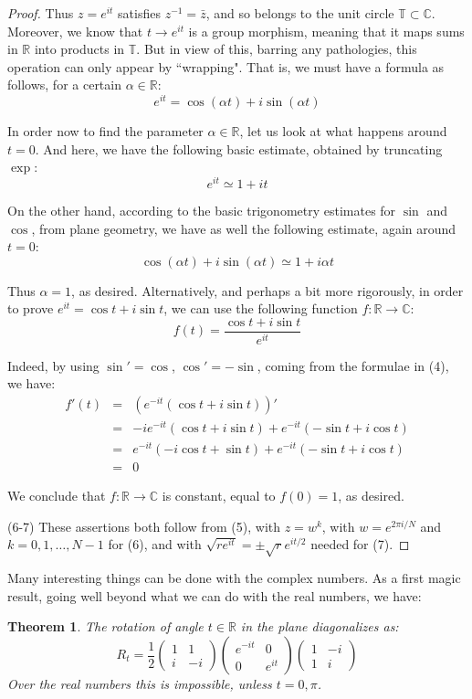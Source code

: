 \documentclass[12pt]{amsbook}
\newtheorem{theorem}{Theorem}[chapter]
\begin{document}
\begin{proof}
Thus $z=e^{it}$ satisfies $z^{-1}=\bar{z}$, and so belongs to the unit circle $\mathbb T\subset\mathbb C$. Moreover, we know that $t\to e^{it}$ is a group morphism, meaning that it maps sums in $\mathbb R$ into products in $\mathbb T$. But in view of this, barring any pathologies, this operation can only appear by ``wrapping". That is, we must have a formula as follows, for a certain $\alpha\in\mathbb R$:
$$e^{it}=\cos(\alpha t)+i\sin(\alpha t)$$

In order now to find the parameter $\alpha\in\mathbb R$, let us look at what happens around $t=0$. And here, we have the following basic estimate, obtained by truncating $\exp$:
$$e^{it}\simeq 1+it$$

On the other hand, according to the basic trigonometry estimates for $\sin$ and $\cos$, from plane geometry, we have as well the following estimate, again around $t=0$:
$$\cos(\alpha t)+i\sin(\alpha t)\simeq 1+i\alpha t$$

Thus $\alpha=1$, as desired. Alternatively, and perhaps a bit more rigorously, in order to prove $e^{it}=\cos t+i\sin t$, we can use the following function $f:\mathbb R\to\mathbb C$:
$$f(t)=\frac{\cos t+i\sin t}{e^{it}}$$

Indeed, by using $\sin'=\cos$, $\cos'=-\sin$, coming from the formulae in (4), we have:
\begin{eqnarray*}
f'(t)
&=&(e^{-it}(\cos t+i\sin t))'\\
&=&-ie^{-it}(\cos t+i\sin t)+e^{-it}(-\sin t+i\cos t)\\
&=&e^{-it}(-i\cos t+\sin t)+e^{-it}(-\sin t+i\cos t)\\
&=&0
\end{eqnarray*}

We conclude that $f:\mathbb R\to\mathbb C$ is constant, equal to $f(0)=1$, as desired.

\medskip

(6-7) These assertions both follow from (5), with $z=w^k$, with $w=e^{2\pi i/N}$ and $k=0,1,\ldots,N-1$ for (6), and with $\sqrt{re^{it}}=\pm\sqrt{r}e^{it/2}$ needed for (7). 
\end{proof}

Many interesting things can be done with the complex numbers. As a first magic result, going well beyond what we can do with the real numbers, we have:


\begin{theorem}
The rotation of angle $t\in\mathbb R$ in the plane diagonalizes as:
$$R_t=\frac{1}{2}\begin{pmatrix}1&1\\i&-i\end{pmatrix}
\begin{pmatrix}e^{-it}&0\\0&e^{it}\end{pmatrix}
\begin{pmatrix}1&-i\\1&i\end{pmatrix}$$
Over the real numbers this is impossible, unless $t=0,\pi$.
\end{theorem}
\end{document}
